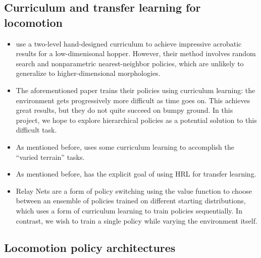 \documentclass[a4paper]{article}
\begin{document}
\subsection*{Curriculum and transfer learning for locomotion}

\begin{itemize}
  \item \cite{karpathy2012curriculum} use a two-level hand-designed curriculum to achieve impressive acrobatic results for a low-dimenisonal hopper. However, their method involves random search and nonparametric nearest-neighbor policies, which are unlikely to generalize to higher-dimensional morphologies.

  \item The aforementioned paper \cite{heess2017emergence} trains their policies using curriculum learning: the environment gets progressively more difficult as time goes on.
    This achieves great results, but they do not quite succeed on bumpy ground.
    In this project, we hope to explore hierarchical policies as a potential solution to this difficult task.

  \item As mentioned before, \cite{peng2018deepmimic} uses some curriculum learning to accomplish the ``varied terrain'' tasks.

  \item As mentioned before, \cite{frans2018meta} has the explicit goal of using HRL for transfer learning.

  \item Relay Nets \citep{kumar2017relay} are a form of policy switching using the value function to choose between an ensemble of policies trained on different starting distributions, which uses a form of curriculum learning to train policies sequentially.
    In contrast, we wish to train a single policy while varying the environment itself.

\end{itemize}

\subsection*{Locomotion policy architectures}
\end{document}
